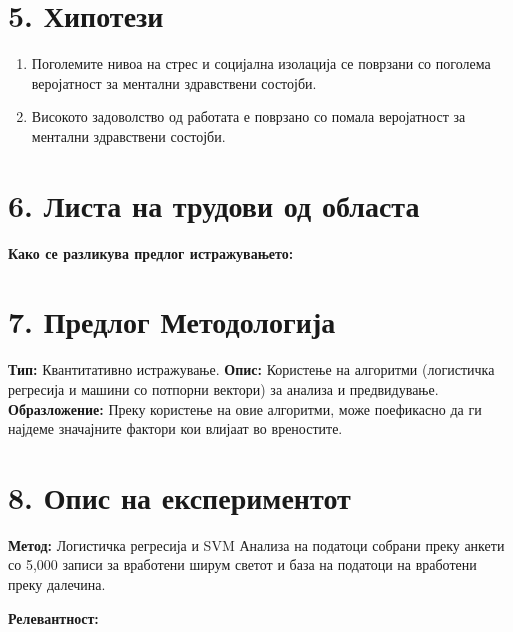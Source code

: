 \documentclass[12pt]{article}
\begin{document}
\section*{5. Хипотези}
\begin{enumerate}
    \item Поголемите нивоа на стрес и социјална изолација се поврзани со поголема веројатност за ментални здравствени состојби.
    \item Високото задоволство од работата е поврзано со помала веројатност за ментални здравствени состојби.
\end{enumerate}

\section*{6. Листа на трудови од областа}
\begin{itemize}
    
\end{itemize}

\textbf{Како се разликува предлог истражувањето:}  
 

\section*{7. Предлог Методологија}
\textbf{Тип:} Квантитативно истражување. \newline
\textbf{Опис:} Користење на алгоритми (логистичка регресија и машини со потпорни вектори) за анализа и предвидување. \newline 
\textbf{Образложение:} Преку користење на овие алгоритми, може поефикасно да ги најдеме значајните фактори кои влијаат во вреностите. \newline 

\section*{8. Опис на експериментот}
\textbf{Метод:}  
Логистичка регресија и SVM Анализа на податоци собрани преку анкети со 5,000 записи за вработени ширум светот и база на податоци на вработени преку далечина.  

\textbf{Релевантност:}  
\end{document}
